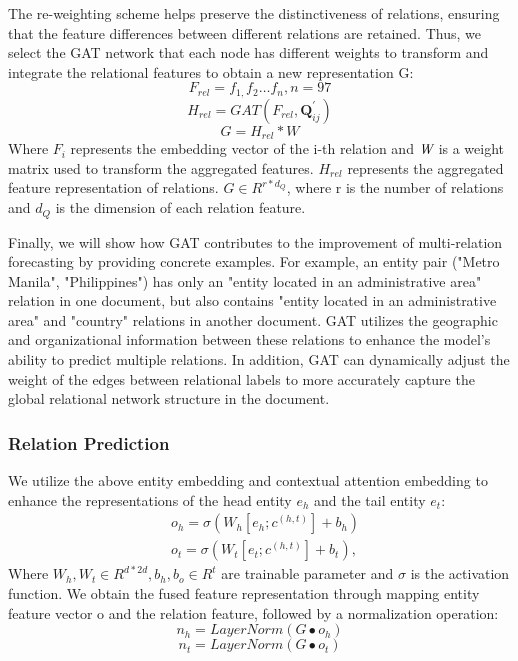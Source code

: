 \documentclass[preprint,12pt]{elsarticle}
\begin{document}
The re-weighting scheme helps preserve the distinctiveness of relations, ensuring that the feature differences between different relations are retained. Thus, we select the GAT network that each node has different weights to transform and integrate the relational features to obtain a new representation G:
\begin{equation}
F_{rel} = f_{1,}f_{2}\ldots f_{n},n = 97
\label{eq10}
\end{equation}
\begin{equation}
H_{rel} = GAT\left( {F_{rel},\mathbf{Q}_{ij}^{'}} \right)
\label{eq11}
\end{equation}
\begin{equation}
G = H_{rel}*W
\label{eq12}
\end{equation}
Where $F_i$ represents the embedding vector of the i-th relation and $\emph{W}$ is a weight matrix used to transform the aggregated features. $H_{rel}$ represents the aggregated feature representation of relations. $G\in R^{r*{d_Q}} $, where r is the number of relations and $d_Q$ is the dimension of each relation feature.

Finally, we will show how GAT contributes to the improvement of multi-relation forecasting by providing concrete examples. For example, an entity pair ("Metro Manila", "Philippines") has only an "entity located in an administrative area" relation in one document, but also contains "entity located in an administrative area" and "country" relations in another document. GAT utilizes the geographic and organizational information between these relations to enhance the model's ability to predict multiple relations. In addition, GAT can dynamically adjust the weight of the edges between relational labels to more accurately capture the global relational network structure in the document.

\subsubsection{Relation Prediction}\label{subsubsec3}
We utilize the above entity embedding and contextual attention embedding to enhance the representations of the head entity $e_h$ and the tail entity $e_t$:
\begin{equation}
\begin{array}{rr}
 & {o_{h} = {\sigma\left( {W_{h}\left\lbrack {e_{h};c^{({h,t})}} \right\rbrack + b_{h}} \right)}} \\
 & {o_{t} = {\sigma\left( {W_{t}\left\lbrack {e_{t};c^{({h,t})}} \right\rbrack + b_{t}} \right)},}
\end{array}
\label{eq13}
\end{equation}
Where $W_h,W_t\in R^{d*2d},b_h,b_o\in R^t$ are trainable parameter and $\sigma$ is the activation function. We obtain the fused feature representation through mapping entity feature vector o and the relation feature, followed by a normalization operation:
\begin{equation}
n_{h} = LayerNorm\left( {G \bullet o_{h}} \right)
\label{eq14}
\end{equation}
\begin{equation}
n_{t} = LayerNorm\left( {G \bullet o_{t}} \right)
\label{eq15}
\end{equation}
\end{document}
